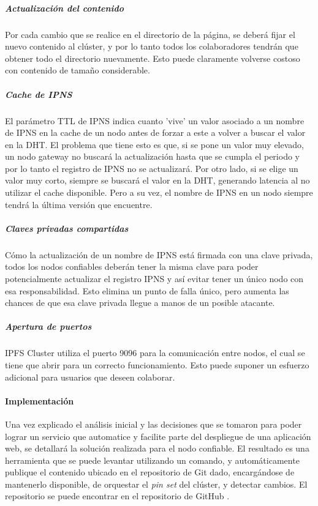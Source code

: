 \subparagraph{Actualización del contenido} Por cada cambio que se realice en el directorio de la página, se deberá fijar el nuevo contenido al clúster, y por lo tanto todos los colaboradores tendrán que obtener todo el directorio nuevamente. Esto puede claramente volverse costoso con contenido de tamaño considerable.
    
\subparagraph{Cache de IPNS} El parámetro TTL de IPNS indica cuanto 'vive' un valor asociado a un nombre de IPNS en la cache de un nodo antes de forzar a este a volver a buscar el valor en la DHT. El problema que tiene esto es que, si se pone un valor muy elevado, un nodo gateway no buscará la actualización hasta que se cumpla el periodo y por lo tanto el registro de IPNS no se actualizará. Por otro lado, si se elige un valor muy corto, siempre se buscará el valor en la DHT, generando latencia al no utilizar el cache disponible. Pero a su vez, el nombre de IPNS en un nodo siempre tendrá la última versión que encuentre.

\subparagraph{Claves privadas compartidas} Cómo la actualización de un nombre de IPNS está firmada con una clave privada, todos los nodos confiables deberán tener la misma clave para poder potencialmente actualizar el registro IPNS y así evitar tener un único nodo con esa responsabilidad. Esto elimina un punto de falla único, pero aumenta las chances de que esa clave privada llegue a manos de un posible atacante.

\subparagraph{Apertura de puertos} IPFS Cluster utiliza el puerto 9096 para la comunicación entre nodos, el cual se tiene que abrir para un correcto funcionamiento. Esto puede suponer un esfuerzo adicional para usuarios que deseen colaborar.

\paragraph{Implementación}

Una vez explicado el análisis inicial y las decisiones que se tomaron para poder lograr un servicio que automatice y facilite parte del despliegue de una aplicación web, se detallará la solución realizada para el nodo confiable. El resultado es una herramienta que se puede levantar utilizando un comando, y automáticamente publique el contenido ubicado en el repositorio de Git dado, encargándose de mantenerlo disponible, de orquestar el \textit{pin set} del clúster, y detectar cambios. El repositorio se puede encontrar en el repositorio de GitHub \cite{repo-trusted-peer}.

